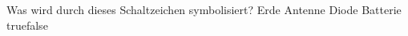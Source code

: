     {Was wird durch dieses Schaltzeichen symbolisiert?}
    {Erde}
    {Antenne}
    {Diode}
    {Batterie}
    {true}{false}